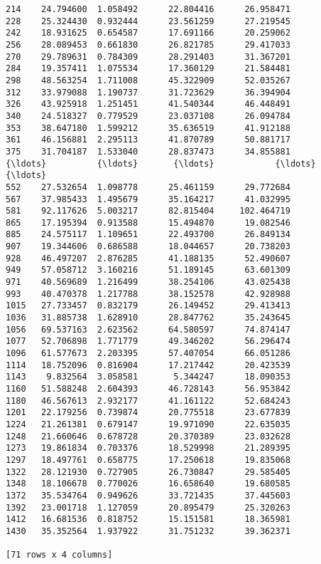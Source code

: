 \documentclass[11pt]{article}
\begin{document}
\begin{Verbatim}[commandchars=\\\{\}]
214    24.794600  1.058492      22.804416      26.958471
228    25.324430  0.932444      23.561259      27.219545
242    18.931625  0.654587      17.691166      20.259062
256    28.089453  0.661830      26.821785      29.417033
270    29.789631  0.784309      28.291403      31.367201
284    19.357411  1.075534      17.360129      21.584481
298    48.563254  1.711008      45.322909      52.035267
312    33.979088  1.190737      31.723629      36.394904
326    43.925918  1.251451      41.540344      46.448491
340    24.518327  0.779529      23.037108      26.094784
353    38.647180  1.599212      35.636519      41.912188
361    46.156881  2.295113      41.870789      50.881717
375    31.704187  1.533040      28.837473      34.855881
{\ldots}          {\ldots}       {\ldots}            {\ldots}            {\ldots}
552    27.532654  1.098778      25.461159      29.772684
567    37.985433  1.495679      35.164217      41.032995
581    92.117626  5.003217      82.815404     102.464719
865    17.195394  0.913588      15.494870      19.082546
885    24.575117  1.109651      22.493700      26.849134
907    19.344606  0.686588      18.044657      20.738203
928    46.497207  2.876285      41.188135      52.490607
949    57.058712  3.160216      51.189145      63.601309
971    40.569689  1.216499      38.254106      43.025438
993    40.470378  1.217788      38.152578      42.928988
1015   27.733457  0.832179      26.149452      29.413413
1036   31.885738  1.628910      28.847762      35.243645
1056   69.537163  2.623562      64.580597      74.874147
1077   52.706898  1.771779      49.346202      56.296474
1096   61.577673  2.203395      57.407054      66.051286
1114   18.752096  0.816904      17.217442      20.423539
1143    9.832564  3.058581       5.344247      18.090353
1160   51.588248  2.604393      46.728143      56.953842
1180   46.567613  2.932177      41.161122      52.684243
1201   22.179256  0.739874      20.775518      23.677839
1224   21.261381  0.679147      19.971090      22.635035
1248   21.660646  0.678728      20.370389      23.032628
1273   19.861834  0.703376      18.529998      21.289395
1297   18.497761  0.658775      17.250618      19.835068
1322   28.121930  0.727905      26.730847      29.585405
1348   18.106678  0.770026      16.658640      19.680585
1372   35.534764  0.949626      33.721435      37.445603
1392   23.001718  1.127059      20.895479      25.320263
1412   16.681536  0.818752      15.151581      18.365981
1430   35.352564  1.937922      31.751232      39.362371

[71 rows x 4 columns]

    \end{Verbatim}
\end{document}
